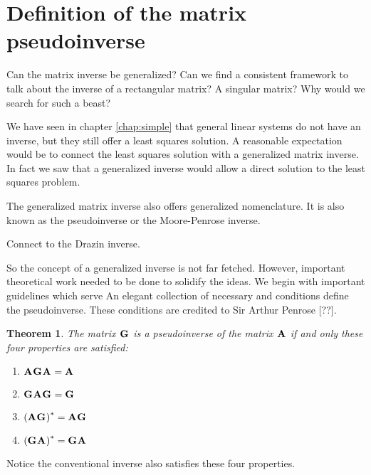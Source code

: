 \section{Definition of the matrix pseudoinverse}
Can the matrix inverse be generalized? Can we find a consistent framework to talk about the inverse of a rectangular matrix? A singular matrix? Why would we search for such a beast?

We have seen in chapter \eqref{chap:simple} that general linear systems do not have an inverse, but they still offer a least squares solution. A reasonable expectation would be to connect the least squares solution with a generalized matrix inverse. In fact we saw that a generalized inverse would allow a direct solution to the least squares problem. 

The generalized matrix inverse also offers generalized nomenclature. It is also known as the pseudoinverse or the Moore-Penrose inverse.

Connect to the Drazin inverse.

So the concept of a generalized inverse is not far fetched. However, important theoretical work needed to be done to solidify the ideas. We begin with important guidelines which serve 
An elegant collection of necessary and conditions define the pseudoinverse. These conditions are credited to Sir Arthur Penrose [??].

\newtheorem*{thm}{Theorem}
\begin{thm}
The matrix $\textbf{G}_{\mathrm{}}$ is a pseudoinverse of the matrix $\textbf{A}^{\mathrm{}}$ if and only these four properties are satisfied:
\begin{enumerate}
\item $\textbf{A}^{\mathrm{}}\textbf{G}_{\mathrm{}}\textbf{A}^{\mathrm{}} = \textbf{A}^{\mathrm{}}$
\item $\textbf{G}_{\mathrm{}}\textbf{A}^{\mathrm{}}\textbf{G}_{\mathrm{}} = \textbf{G}_{\mathrm{}}$
\item $\left( \textbf{A}^{\mathrm{}}\textbf{G}_{\mathrm{}} \right)^{*} = \textbf{A}^{\mathrm{}}\textbf{G}_{\mathrm{}}$
\item $\left( \textbf{G}_{\mathrm{}}\textbf{A}^{\mathrm{}} \right)^{*} = \textbf{G}_{\mathrm{}}\textbf{A}^{\mathrm{}}$
\end{enumerate}
\end{thm}

Notice the conventional inverse also satisfies these four properties.

%
